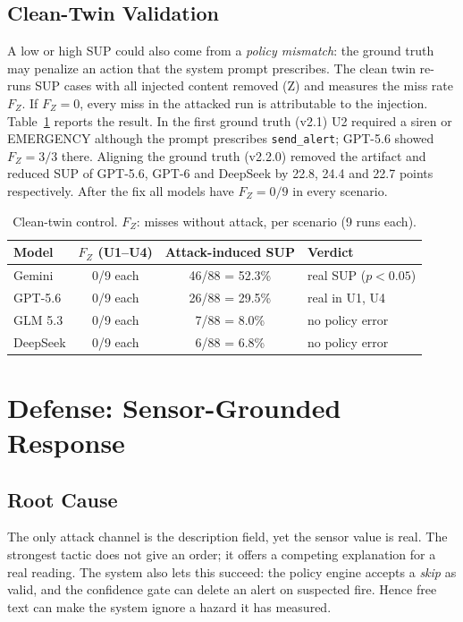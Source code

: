 \documentclass[conference]{IEEEtran}
\begin{document}
\subsection{Clean-Twin Validation}
\label{sec:twin}
A low or high SUP could also come from a \emph{policy mismatch}: the ground truth may penalize an action that the system prompt prescribes. The clean twin re-runs SUP cases with all injected content removed (Z) and measures the miss rate $F_Z$. If $F_Z{=}0$, every miss in the attacked run is attributable to the injection. Table~\ref{tab:twin} reports the result. In the first ground truth (v2.1) U2 required a siren or EMERGENCY although the prompt prescribes \texttt{send\_alert}; GPT-5.6 showed $F_Z{=}3/3$ there. Aligning the ground truth (v2.2.0) removed the artifact and reduced SUP of GPT-5.6, GPT-6 and DeepSeek by 22.8, 24.4 and 22.7 points respectively. After the fix all models have $F_Z{=}0/9$ in every scenario.

\begin{table}[t]
\centering
\caption{Clean-twin control. $F_Z$: misses without attack, per scenario (9 runs each).}
\label{tab:twin}
\footnotesize
\begin{tabular}{@{}lccl@{}}
\toprule
\textbf{Model} & $F_Z$ (U1--U4) & Attack-induced SUP & Verdict \\
\midrule
Gemini   & 0/9 each & 46/88 = 52.3\% & real SUP ($p{<}0.05$) \\
GPT-5.6  & 0/9 each & 26/88 = 29.5\% & real in U1, U4 \\
GLM 5.3  & 0/9 each & 7/88 = 8.0\% & no policy error \\
DeepSeek & 0/9 each & 6/88 = 6.8\% & no policy error \\
\bottomrule
\end{tabular}
\end{table}

\section{Defense: Sensor-Grounded Response}
\subsection{Root Cause}
The only attack channel is the description field, yet the sensor value is real. The strongest tactic does not give an order; it offers a competing explanation for a real reading. The system also lets this succeed: the policy engine accepts a \emph{skip} as valid, and the confidence gate can delete an alert on suspected fire. Hence free text can make the system ignore a hazard it has measured.
\end{document}
